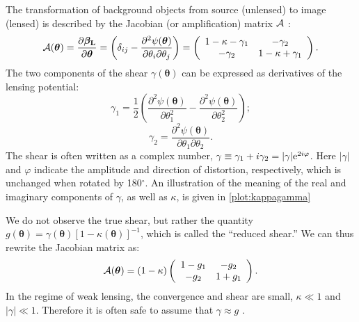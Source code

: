 The transformation of background objects from source (unlensed) to image (lensed) is described by the Jacobian (or amplification) matrix $\cal{A}$ \citep[e.g.][]{DodelsonText}: 
\begin{equation}
\label{eqn:A}
{\cal A}(\bm{\theta}) = \frac{\partial \bm{\beta_{\rm L}}}{\partial \bm{\theta}}  = \left( \delta_{ij} - \frac{\partial^2 \psi(\bm{\theta})}{\partial \theta_{i} \partial \theta_j} \right) = \left( \begin{array}{cc}
{1-\kappa-\gamma_1} & {-\gamma_2} \\
{-\gamma_2} & {1-\kappa+\gamma_1} \\
\end{array} \right). 
\end{equation}
The two components of the shear $\gamma (\bm{\theta})$ can be expressed as derivatives of the lensing potential:
\begin{equation}
\gamma_1 = \frac{1}{2} \left( \frac{\partial^2 \psi(\bm{\theta})}{\partial\theta_1^2} - \frac{\partial^2 \psi(\bm{\theta})}{\partial\theta_2^2} \right); 
\end{equation}
\begin{equation}
\gamma_2 = \frac{\partial^2 \psi(\bm{\theta})}{\partial\theta_1 \partial\theta_2}.
\end{equation}
The shear is often written as a complex number, $\gamma \equiv \gamma_1 + i\gamma_2 = |\gamma|{\rm e}^{2i\varphi}$. Here $|\gamma|$ and $\varphi$ indicate the amplitude and direction of distortion, respectively, which is unchanged when rotated by 180$^\circ$. An illustration of the meaning of the real and imaginary components of $\gamma$, as well as $\kappa$, is given in \autoref{plot:kappagamma}

We do not observe the true shear, but rather the quantity $g(\bm{\theta}) = \gamma (\bm{\theta}) \left[1-\kappa (\bm{\theta}) \right]^{-1}$, which is called the ``reduced shear.'' We can thus rewrite the Jacobian matrix as:
\begin{equation}
\label{eqn:Ag}
{\cal A}(\bm{\theta}) = (1-\kappa) \left( \begin{array}{cc}
{1-g_1} & {-g_2} \\
{-g_2} & {1+g_1} \\
\end{array} \right). 
\end{equation}
In the regime of weak lensing, the convergence and shear are small, $\kappa \ll 1$ and $| \gamma| \ll 1$. Therefore it is often safe to assume that $\gamma \approx g$ \citep{Schneider06_WeakGravLens}.

